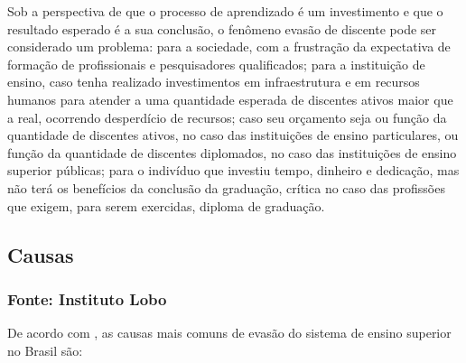 \documentclass{report}
\begin{document}
Sob a perspectiva de que o processo de aprendizado é um investimento e que o resultado esperado é a sua conclusão, o fenômeno evasão de discente pode ser considerado um problema: para a sociedade, com a frustração da expectativa de formação de profissionais e pesquisadores qualificados; para a instituição de ensino, caso tenha realizado investimentos em infraestrutura e em recursos humanos para atender a uma quantidade esperada de discentes ativos maior que a real, ocorrendo desperdício de recursos; caso seu orçamento seja ou função da quantidade de discentes ativos, no caso das instituições de ensino particulares, ou função da quantidade de discentes diplomados, no caso das instituições de ensino superior públicas; para o indivíduo que investiu tempo, dinheiro e dedicação, mas não terá os benefícios da conclusão da graduação, crítica no caso das profissões que exigem, para serem exercidas, diploma de graduação.

\subsection{Causas}

\subsubsection{Fonte: Instituto Lobo}
De acordo com \cite{evasao_panorama2}, as causas mais comuns de evasão do sistema de ensino superior no Brasil são:
\end{document}
